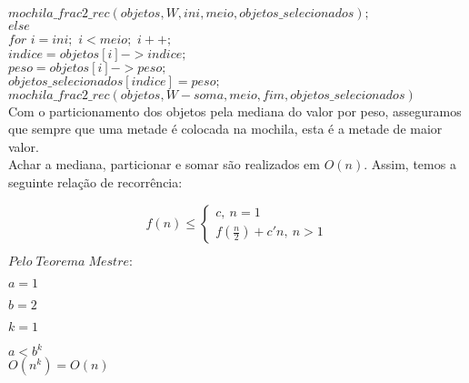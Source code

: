 \documentclass[10pt,a4paper]{article}
\begin{document}
	\hspace{2cm}$mochila\_frac2\_rec(objetos,W,ini, meio, objetos\_selecionados);$\\
	
	\hspace{1cm}$else$\\
	
	\hspace{2cm}$for$ $i=ini;$ $i<meio;$ $i++;$\\
	
	\hspace{3cm}$indice = objetos[i]->indice;$\\
	
	\hspace{3cm}$peso = objetos[i]->peso;$\\
	
	\hspace{3cm}$objetos\_selecionados[indice] = peso;$\\
	
	\hspace{2cm}$mochila\_frac2\_rec(objetos,W - soma,meio,fim, objetos\_selecionados)$\\
	
	
	Com o particionamento dos objetos pela mediana do valor por peso, asseguramos que sempre que uma metade é colocada na mochila, esta é a metade de maior valor.\\
	
	Achar a mediana, particionar e somar são realizados em $O(n)$.
Assim, temos a seguinte relação de recorrência:

 \[
    f(n)\leqslant\left\{
                \begin{array}{ll}
                     c,\: n = 1\\
                  f(\frac{n}{2}) + c'n, \: n>1
                \end{array}
              \right.
    \]            
  
           
   $Pelo\; Teorema\; Mestre:$
   
	\hspace{1cm}$a = 1$
	
	\hspace{1cm}$b = 2$
	
	\hspace{1cm}$k = 1$
	
	\hspace{1cm}$a < b^{k}$\\

	
	\hspace{5cm}$O(n^{k}) = O(n)$
\end{document}
